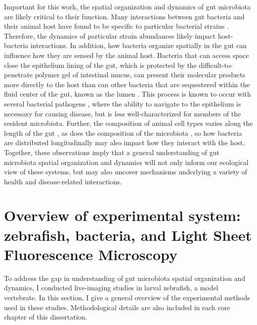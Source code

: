 Important for this work, the spatial organization and dynamics of gut microbiota are likely critical to their function. Many interactions between gut bacteria and their animal host have found to be specific to particular bacterial strains \cite{wiles2020patterns}. Therefore, the dynamics of particular strain abundances likely impact host-bacteria interactions. In addition, how bacteria organize spatially in the gut can influence how they are sensed by the animal host. Bacteria that can access space close the epithelium lining of the gut, which is protected by the difficult-to-penetrate polymer gel of intestinal mucus, can present their molecular products more directly to the host than can other bacteria that are sequestered within the fluid center of the gut, known as the lumen \cite{johansson_gastrointestinal_2013,cullender_innate_2013,vaishnava_antibacterial_2011}. This process is known to occur with several bacterial pathogens \cite{chow_pathobionts_2011,gevers_treatment-naive_2014,kostic_microbiome_2014,carvalho_transient_2012}, where the ability to navigate to the epithelium is necessary for causing disease, but is less well-characterized for members of the resident microbiota. Further, the composition of animal cell types varies along the length of the gut \cite{lickwar_genomic_2017}, as does the composition of the microbiota \cite{donaldson_gut_2015}, so how bacteria are distributed longitudinally may also impact how they interact with the host. Together, these observations imply that a general understanding of gut microbiota spatial organization and dynamics will not only inform our ecological view of these systems, but may also uncover mechanisms underlying a variety of health and disease-related interactions.  


\section{Overview of experimental system: zebrafish, bacteria, and Light Sheet Fluorescence Microscopy}

To address the gap in understanding of gut microbiota spatial organization and dynamics, I conducted live-imaging studies in larval zebrafish, a model vertebrate. In this section, I give a general overview of the experimental methods used in these studies. Methodological details are also included in each core chapter of this dissertation. 

